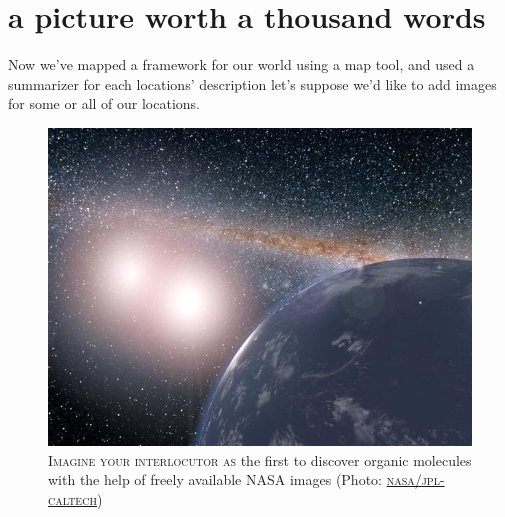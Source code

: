 \section{a picture worth a thousand words}
Now we've mapped a framework for our world using a map tool, and used a summarizer
for each locations' description let's suppose we'd like to add images for some or all
of our locations.
\begin{figure}[h]                                                           
  \includegraphics[width=\textwidth]{./media/images/exoplanet}
  \small{\textsc{Imagine your interlocutor as} the first to discover
      organic molecules with the help of freely available NASA images (Photo:
      \href{https://images.nasa.gov/details-PIA21470.html}{\textsc{nasa/jpl-caltech}})}
  \label{fig:nasa}
\end{figure}


